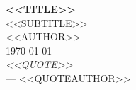 \begin{titlepage}
    \centering
    {\Huge\bfseries <<TITLE>>}\\[0.5cm]
    {\Large <<SUBTITLE>>}\\[1.5cm]
    {\large <<AUTHOR>>}\\[0.5cm]
    {\large \today}\\[1.5cm]
    \vfill
    {\large \textit{<<QUOTE>>}}\\[0.2cm]
    {\large --- <<QUOTEAUTHOR>>}
\end{titlepage}